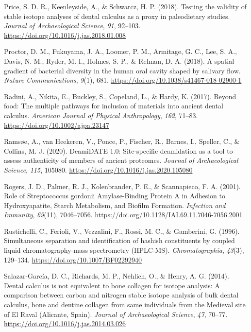 \documentclass[
  letterpaper,
]{book}
\newlength{\cslhangindent}
\newlength{\cslentryspacingunit} %
\newenvironment{CSLReferences}[2] %
 {%
  \setlength{\parindent}{0pt}
  \ifodd #1
  \let\oldpar\par
  \def\par{\hangindent=\cslhangindent\oldpar}
  \fi
  \setlength{\parskip}{#2\cslentryspacingunit}
 }%
 {}
\begin{document}
\begin{CSLReferences}{1}{0}
\leavevmode{}%
Price, S. D. R., Keenleyside, A., \& Schwarcz, H. P. (2018). Testing the
validity of stable isotope analyses of dental calculus as a proxy in
paleodietary studies. \emph{Journal of Archaeological Science},
\emph{91}, 92--103. \url{https://doi.org/10.1016/j.jas.2018.01.008}

\leavevmode{}%
Proctor, D. M., Fukuyama, J. A., Loomer, P. M., Armitage, G. C., Lee, S.
A., Davis, N. M., Ryder, M. I., Holmes, S. P., \& Relman, D. A. (2018).
A spatial gradient of bacterial diversity in the human oral cavity
shaped by salivary flow. \emph{Nature Communications}, \emph{9}(1), 681.
\url{https://doi.org/10.1038/s41467-018-02900-1}

\leavevmode{}%
Radini, A., Nikita, E., Buckley, S., Copeland, L., \& Hardy, K. (2017).
Beyond food: {The} multiple pathways for inclusion of materials into
ancient dental calculus. \emph{American Journal of Physical
Anthropology}, \emph{162}, 71--83.
\url{https://doi.org/10.1002/ajpa.23147}

\leavevmode{}%
Ramsøe, A., van Heekeren, V., Ponce, P., Fischer, R., Barnes, I.,
Speller, C., \& Collins, M. J. (2020). {DeamiDATE} 1.0: {Site-specific}
deamidation as a tool to assess authenticity of members of ancient
proteomes. \emph{Journal of Archaeological Science}, \emph{115}, 105080.
\url{https://doi.org/10.1016/j.jas.2020.105080}

\leavevmode{}%
Rogers, J. D., Palmer, R. J., Kolenbrander, P. E., \& Scannapieco, F. A.
(2001). Role of {Streptococcus} gordonii {Amylase-Binding Protein A} in
{Adhesion} to {Hydroxyapatite}, {Starch Metabolism}, and {Biofilm
Formation}. \emph{Infection and Immunity}, \emph{69}(11), 7046--7056.
\url{https://doi.org/10.1128/IAI.69.11.7046-7056.2001}

\leavevmode{}%
Rustichelli, C., Ferioli, V., Vezzalini, F., Rossi, M. C., \& Gamberini,
G. (1996). Simultaneous separation and identification of hashish
constituents by coupled liquid chromatography-mass spectrometry
({HPLC-MS}). \emph{Chromatographia}, \emph{43}(3), 129--134.
\url{https://doi.org/10.1007/BF02292940}

\leavevmode{}%
Salazar-García, D. C., Richards, M. P., Nehlich, O., \& Henry, A. G.
(2014). Dental calculus is not equivalent to bone collagen for isotope
analysis: A comparison between carbon and nitrogen stable isotope
analysis of bulk dental calculus, bone and dentine collagen from same
individuals from the {Medieval} site of {El Raval} ({Alicante},
{Spain}). \emph{Journal of Archaeological Science}, \emph{47}, 70--77.
\url{https://doi.org/10.1016/j.jas.2014.03.026}


\end{CSLReferences}
\end{document}
